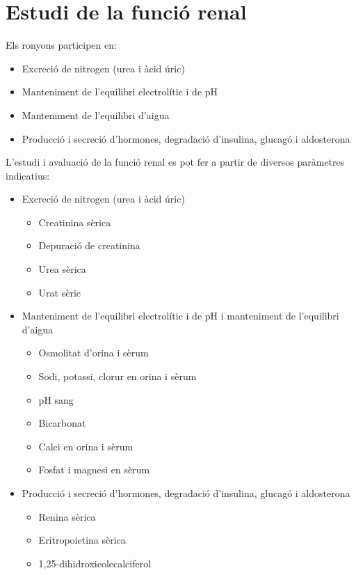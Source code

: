 \section{Estudi de la funció renal}
\label{sec:estudi-de-la}

Els ronyons participen en:
\begin{itemize}
\item Excreció de nitrogen (urea i àcid úric)
\item Manteniment de l'equilibri electrolític i de pH
\item Manteniment de l'equilibri d'aigua
\item Producció i secreció d'hormones, degradació d'insulina, glucagó
  i aldosterona
\end{itemize}

L'estudi i avaluació de la funció renal es pot fer a partir de
diversos paràmetres indicatius:
\begin{itemize}
\item Excreció de nitrogen (urea i àcid úric)
  \begin{itemize}
  \item Creatinina sèrica
  \item Depuració de creatinina
  \item Urea sèrica
  \item Urat sèric
  \end{itemize}
\item Manteniment de l'equilibri electrolític i de pH i manteniment de
  l'equilibri d'aigua
  \begin{itemize}
  \item Osmolitat d'orina i sèrum
  \item Sodi, potassi, clorur en orina i sèrum
  \item pH sang
  \item Bicarbonat
  \item Calci en orina i sèrum
  \item Fosfat i magnesi en sèrum
  \end{itemize}
\item Producció i secreció d'hormones, degradació d'insulina, glucagó
  i aldosterona
  \begin{itemize}
  \item Renina sèrica
  \item Eritropoietina sèrica
  \item 1,25-dihidroxicolecalciferol
  \end{itemize}
\end{itemize}

